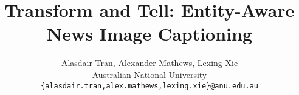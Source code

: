 \documentclass[10pt,twocolumn,letterpaper]{article}
\begin{document}
\title{Transform and Tell: Entity-Aware News Image Captioning}

\author{Alasdair Tran, Alexander Mathews, Lexing Xie\\
Australian National University\\
{\tt\small \{alasdair.tran,alex.mathews,lexing.xie\}@anu.edu.au}
}

\maketitle










{\small


}
\end{document}
